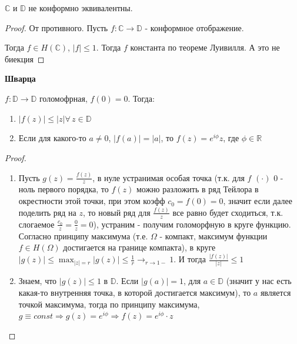 \begin{theorem}
    $\mathbb{C}$ и $\mathbb{D}$ не конформно эквивалентны.
\end{theorem}

\begin{proof}
    От противного. Пусть $f : \mathbb{C} \to \mathbb{D}$ - конформное отображение.

    Тогда $f \in H(\mathbb{C})$, $|f| \leqslant 1$. Тогда $f$ константа
    по теореме Луивилля. А это не биекция
\end{proof}

\begin{lemma}
    \textbf{Шварца}

    $f : \mathbb{D} \to \mathbb{D}$ голомофрная, $f(0) = 0$. Тогда:
    \begin{enumerate}
        \item $|f(z)| \leqslant |z| \forall \, z \in \mathbb{D}$
        \item Если для какого-то $a \neq 0$, $|f(a)| = |a|$, то $f(z) = e^{i\phi} z$, где $\phi \in \mathbb{R}$
    \end{enumerate}
\end{lemma}

\begin{proof}
    \begin{enumerate}
        \item {
            Пусть $g(z) = \frac{f(z)}{z}$, в нуле устранимая особая точка (т.к. для $f$ $(\cdot)$ $0$ - ноль первого порядка, то $f(z)$ можно разложить в ряд Тейлора в окрестности этой точки, при этом коэфф $c_0 = f(0) = 0$, значит если далее поделить ряд на $z$, то новый ряд для $\frac{f(z)}{z}$ все равно будет сходиться, т.к. слогаемое $\frac{c_0}{z} = \frac{0}{z} = 0$), устраним - получим голоморфную в круге функцию.
            Согласно принципу максимума (т.е. $\Omega$ - компакт, максимум функции $f \in H(\Omega)$ достигается на границе компакта), в круге $|g(z)| \leqslant \max_{|z| = r} |g(z)| \leqslant \frac{1}{r} \rightarrow_{r \to 1-} 1$.
            И тогда $\frac{|f(z)|}{|z|} \leqslant 1$
        }
        \item {
            Знаем, что $|g(z)| \leqslant 1$ в $\mathbb{D}$. Если $|g(a)| = 1$, для $a \in \mathbb{D}$ (значит у нас есть какая-то внутренняя точка, в которой достигается максимум), то
            $a$ является точкой максимума, тогда по принципу максимума, $g \equiv const \Rightarrow g(z) = e^{i\phi} \Rightarrow f(z) = e^{i\phi} \cdot z$
        }
    \end{enumerate}

\end{proof}

